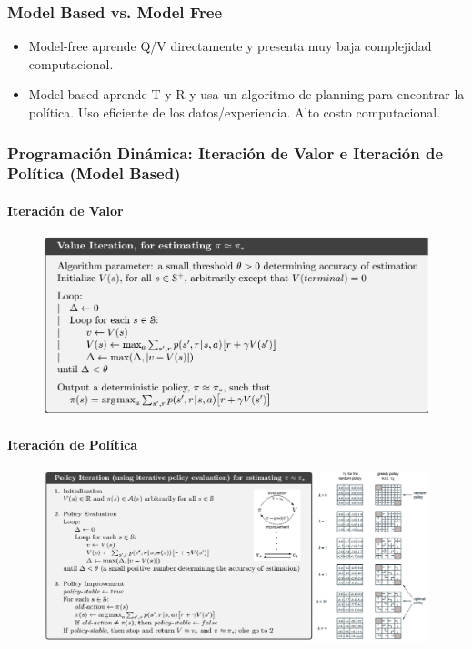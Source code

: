 \documentclass[11pt]{article}
\makeatletter
\def\maxwidth{\ifdim\Gin@nat@width>\linewidth\linewidth
    \else\Gin@nat@width\fi}
\let\Oldincludegraphics\includegraphics
\renewcommand{\includegraphics}[1]{\Oldincludegraphics[width=.8\maxwidth]{#1}}
\makeatother
\begin{document}
\subsubsection{Model Based vs. Model
Free}\label{model-based-vs.-model-free}

\begin{itemize}
\item
  Model-free aprende Q/V directamente y presenta muy baja complejidad
  computacional.
\item
  Model-based aprende T y R y usa un algoritmo de planning para
  encontrar la política. Uso eficiente de los datos/experiencia. Alto
  costo computacional.
\end{itemize}

    \subsubsection{Programación Dinámica: Iteración de Valor e Iteración de
Política (Model
Based)}\label{programaciuxf3n-dinuxe1mica-iteraciuxf3n-de-valor-e-iteraciuxf3n-de-poluxedtica-model-based}

\paragraph{Iteración de Valor}\label{iteraciuxf3n-de-valor}

\begin{figure}
\centering
\includegraphics{images/Iteracion de Valor.png}
\caption{}
\end{figure}

\paragraph{Iteración de Política}\label{iteraciuxf3n-de-poluxedtica}

\begin{figure}
\centering
\includegraphics{images/Iteracion de Politica.png}
\caption{}
\end{figure}


    
    
    
    
\end{document}
